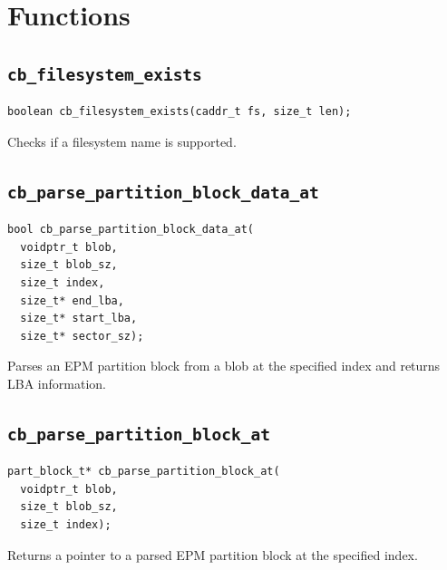 \documentclass[12pt]{article}
\begin{document}
\section{Functions}

\subsection{\texttt{cb\_filesystem\_exists}}
\begin{lstlisting}[style=customc]
boolean cb_filesystem_exists(caddr_t fs, size_t len);
\end{lstlisting}
Checks if a filesystem name is supported.

\subsection{\texttt{cb\_parse\_partition\_block\_data\_at}}
\begin{lstlisting}[style=customc]
bool cb_parse_partition_block_data_at(
  voidptr_t blob,
  size_t blob_sz,
  size_t index,
  size_t* end_lba,
  size_t* start_lba,
  size_t* sector_sz);
\end{lstlisting}
Parses an EPM partition block from a blob at the specified index and returns LBA information.

\subsection{\texttt{cb\_parse\_partition\_block\_at}}
\begin{lstlisting}[style=customc]
part_block_t* cb_parse_partition_block_at(
  voidptr_t blob,
  size_t blob_sz,
  size_t index);
\end{lstlisting}
Returns a pointer to a parsed EPM partition block at the specified index.
\end{document}
